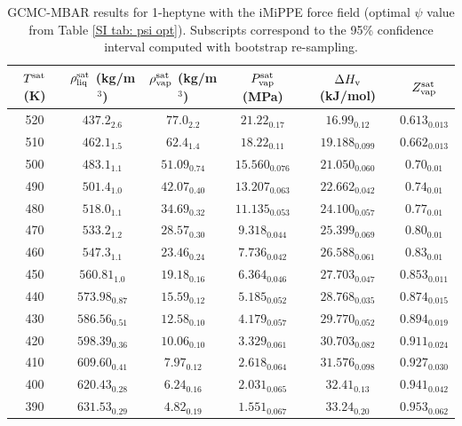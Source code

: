 \documentclass[journal=jctc,manuscript=article]{achemso}
\begin{document}
\begin{table}[htb!]
	\caption{GCMC-MBAR results for 1-heptyne with the iMiPPE force field (optimal $\psi$ value from Table \ref{SI tab: psi opt}). Subscripts correspond to the 95\% confidence interval computed with bootstrap re-sampling.}
	\begin{center}
		\begin{tabular}{|c|c|c|c|c|c|}
			\hline
			$T^{\rm sat}$ (K) & $\rho_{\rm liq}^{\rm sat}$ (kg/m$^3$) & $\rho_{\rm vap}^{\rm sat}$ (kg/m$^3$) & $P_{\rm vap}^{\rm sat}$ (MPa) & $\Delta H_{\rm v}$ (kJ/mol) & $Z_{\rm vap}^{\rm sat}$ \\ \hline
			520 & $437.2_{2.6}$ & $77.0_{2.2}$ & $21.22_{0.17}$ & $16.99_{0.12}$ & $0.613_{0.013}$ \\
			510 & $462.1_{1.5}$ & $62.4_{1.4}$ & $18.22_{0.11}$ & $19.188_{0.099}$ & $0.662_{0.013}$ \\
			500 & $483.1_{1.1}$ & $51.09_{0.74}$ & $15.560_{0.076}$ & $21.050_{0.060}$ & $0.70_{0.01}$ \\
			490 & $501.4_{1.0}$ & $42.07_{0.40}$ & $13.207_{0.063}$ & $22.662_{0.042}$ & $0.74_{0.01}$ \\
			480 & $518.0_{1.1}$ & $34.69_{0.32}$ & $11.135_{0.053}$ & $24.100_{0.057}$ & $0.77_{0.01}$ \\
			470 & $533.2_{1.2}$ & $28.57_{0.30}$ & $9.318_{0.044}$ & $25.399_{0.069}$ & $0.80_{0.01}$ \\
			460 & $547.3_{1.1}$ & $23.46_{0.24}$ & $7.736_{0.042}$ & $26.588_{0.061}$ & $0.83_{0.01}$ \\
			450 & $560.81_{1.0}$ & $19.18_{0.16}$ & $6.364_{0.046}$ & $27.703_{0.047}$ & $0.853_{0.011}$ \\
			440 & $573.98_{0.87}$ & $15.59_{0.12}$ & $5.185_{0.052}$ & $28.768_{0.035}$ & $0.874_{0.015}$ \\
			430 & $586.56_{0.51}$ & $12.58_{0.10}$ & $4.179_{0.057}$ & $29.770_{0.052}$ & $0.894_{0.019}$ \\
			420 & $598.39_{0.36}$ & $10.06_{0.10}$ & $3.329_{0.061}$ & $30.703_{0.082}$ & $0.911_{0.024}$ \\
			410 & $609.60_{0.41}$ & $7.97_{0.12}$ & $2.618_{0.064}$ & $31.576_{0.098}$ & $0.927_{0.030}$ \\
			400 & $620.43_{0.28}$ & $6.24_{0.16}$ & $2.031_{0.065}$ & $32.41_{0.13}$ & $0.941_{0.042}$ \\
			390 & $631.53_{0.29}$ & $4.82_{0.19}$ & $1.551_{0.067}$ & $33.24_{0.20}$ & $0.953_{0.062}$ \\
			\hline
		\end{tabular}
	\end{center}
\end{table}
\end{document}

